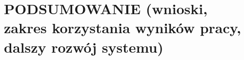 \section{PODSUMOWANIE (wnioski, zakres korzystania wyników pracy, dalszy rozwój systemu)}

\newpage
